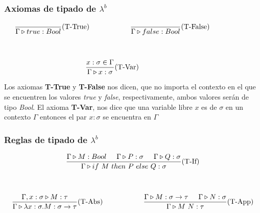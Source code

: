 \subsubsection{Axiomas de tipado de \texorpdfstring{$\lambda^b$}{lambda b}}

\begin{equation*}
\begin{gathered}
    \frac{}{\judgeType{\Gamma}{true}{Bool}}(\text{T-True}) \hspace*{2cm} \frac{}{\judgeType{\Gamma}{false}{Bool}}(\text{T-False})\hspace*{2cm} \\
    \vspace*{5mm} \\
    \frac{x:\sigma\in\Gamma}{\judgeType{\Gamma}{x}{\sigma}}(\text{T-Var})\hspace*{2cm}
\end{gathered}
\end{equation*}

\vspace*{5mm}
Los axiomas \textbf{T-True} y \textbf{T-False} nos dicen, que no importa el contexto en el que se encuentren los valores \textit{true} y \textit{false}, respectivamente, ambos valores serán de tipo \textit{Bool}. El axioma \textbf{T-Var}, nos dice que una variable libre $x$ es de $\sigma$ en un contexto $\Gamma$ entonces el par $x:\sigma$ se encuentra en $\Gamma$

\subsubsection{Reglas de tipado de \texorpdfstring{$\lambda^b$}{lambda b}}
\begin{equation*}
\begin{gathered}
\frac{\judgeType{\Gamma}{M}{Bool}\hspace*{5mm}\judgeType{\Gamma}{P}{\sigma}\hspace*{5mm}\judgeType{\Gamma}{Q}{\sigma}}{\judgeType{\Gamma}{\lambdaIf{M}{P}{Q}}{\sigma}}(\text{T-If}) \\
\vspace*{5mm} \\
\frac {\judgeType{\Gamma,x:\sigma}{M}{\tau}}
      {\judgeType{\Gamma}{\lambdaAbs{x}{\sigma}{M}}{\sigma\to\tau}}(\text{T-Abs})\hspace*{2cm}
\frac{\judgeType{\Gamma}{M}{\sigma\to\tau}\hspace*{5mm}\judgeType{\Gamma}{N}{\sigma}}{\judgeType{\Gamma}{\lambdaApp{M}{N}}{\tau}}(\text{T-App})
\end{gathered}
\end{equation*}

